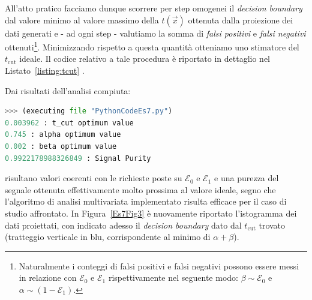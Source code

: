 \noindent All'atto pratico facciamo dunque scorrere per step omogenei il \emph{decision boundary} dal valore minimo al valore massimo della $t(\vec{x})$ ottenuta dalla proiezione dei dati generati e - ad ogni step - valutiamo la somma di \emph{falsi positivi} e \emph{falsi negativi} ottenuti\footnote{Naturalmente i conteggi di falsi positivi e falsi negativi possono essere messi in relazione con $\mathcal{E}_0$ e $\mathcal{E}_1$  rispettivamente nel seguente modo: $\beta \sim \mathcal{E}_0$ e $\alpha \sim (1- \mathcal{E}_1)$.}. Minimizzando rispetto a questa quantità otteniamo uno stimatore del $t_\mathrm{cut}$ ideale. Il codice relativo a tale procedura è riportato in dettaglio nel Listato~\ref{listing:tcut} .\smallskip

\noindent Dai risultati dell'analisi compiuta:

\begin{lstlisting}[language=python, style=Pystyle, numbers=none]
>>> (executing file "PythonCodeEs7.py")
0.003962 : t_cut optimum value
0.745 : alpha optimum value
0.002 : beta optimum value
0.9922178988326849 : Signal Purity
\end{lstlisting}

\noindent risultano valori coerenti con le richieste poste su $\mathcal{E}_0$ e $\mathcal{E}_1$ e una purezza del segnale ottenuta effettivamente molto prossima al valore ideale, segno che l'algoritmo di analisi multivariata implementato risulta efficace per il caso di studio affrontato. In Figura~\ref{Es7Fig3} è nuovamente riportato l'istogramma dei dati proiettati, con indicato adesso il \emph{decision boundary} dato dal $t_\mathrm{cut}$ trovato (tratteggio verticale in blu, corrispondente al minimo di $\alpha+\beta$).

